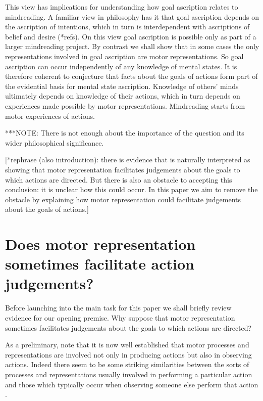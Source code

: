 \documentclass[12pt,\papersize]{extarticle}
\begin{document}
This view has implications for understanding how goal ascription relates to mindreading. A familiar view in philosophy has it that goal ascription depends on the ascription of intentions, which in turn is interdependent with ascriptions of belief and desire (*refs). On this view goal ascription is possible only as part of a larger mindreading project. By contrast we shall show that in some cases the only representations involved in goal ascription are motor representations. So goal ascription can occur independently of any knowledge of mental states. It is therefore coherent to conjecture that facts about the goals of actions form part of the evidential basis for mental state ascription. Knowledge of others' minds ultimately depends on knowledge of their actions, which in turn depends on experiences made possible by motor representations.  Mindreading starts from motor experiences of actions.

***NOTE: There is not enough about the importance of the question and its wider philosophical significance.

[*rephrase (also introduction): there is evidence that is naturally interpreted as showing that motor representation facilitates judgements about the goals to which actions are directed. But there is also an obstacle to accepting this conclusion: it is unclear how this could occur.  In this paper we aim to remove the obstacle by explaining how motor representation could facilitate judgements about the goals of actions.]


\section{Does motor representation sometimes facilitate action judgements?}
\label{sec:evidence}

Before launching into the main task for this paper we shall briefly review evidence for our opening premise. Why suppose that motor representation sometimes facilitates judgements about the goals to which actions are directed?

As a preliminary, note that it is now well established that motor processes and representations are involved not only in producing actions but also in observing actions. Indeed there seem to be some striking similarities between the sorts of processes and representations usually involved in performing a particular action and those which typically occur when observing someone else perform that action \citep{rizzolatti_functional_2010,rizzolatti_mirrors_2008}. 
\end{document}
